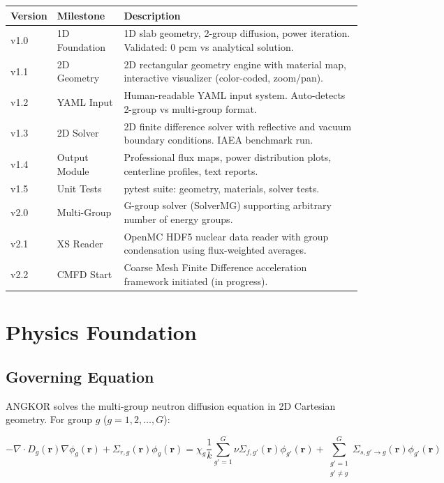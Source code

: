 \documentclass[12pt,a4paper]{article}
\begin{document}
\begin{longtable}{p{2.5cm} p{4cm} p{7cm}}
\toprule
\textbf{Version} & \textbf{Milestone} & \textbf{Description} \\
\midrule
v1.0 & 1D Foundation & 1D slab geometry, 2-group diffusion, power iteration.
Validated: 0 pcm vs analytical solution. \\[6pt]
v1.1 & 2D Geometry & 2D rectangular geometry engine with material map,
interactive visualizer (color-coded, zoom/pan). \\[6pt]
v1.2 & YAML Input & Human-readable YAML input system. Auto-detects 2-group
vs multi-group format. \\[6pt]
v1.3 & 2D Solver & 2D finite difference solver with reflective and vacuum
boundary conditions. IAEA benchmark run. \\[6pt]
v1.4 & Output Module & Professional flux maps, power distribution plots,
centerline profiles, text reports. \\[6pt]
v1.5 & Unit Tests & pytest suite: geometry, materials, solver tests. \\[6pt]
v2.0 & Multi-Group & G-group solver (SolverMG) supporting arbitrary
number of energy groups. \\[6pt]
v2.1 & XS Reader & OpenMC HDF5 nuclear data reader with group condensation
using flux-weighted averages. \\[6pt]
v2.2 & CMFD Start & Coarse Mesh Finite Difference acceleration framework
initiated (in progress). \\
\bottomrule
\end{longtable}

\section{Physics Foundation}

\subsection{Governing Equation}

ANGKOR solves the multi-group neutron diffusion equation in 2D Cartesian
geometry. For group $g$ ($g = 1, 2, \ldots, G$):

\begin{equation}
    -\nabla \cdot D_g(\mathbf{r}) \nabla \phi_g(\mathbf{r})
    + \Sigma_{r,g}(\mathbf{r}) \phi_g(\mathbf{r})
    = \chi_g \frac{1}{k} \sum_{g'=1}^{G} \nu\Sigma_{f,g'}(\mathbf{r})
      \phi_{g'}(\mathbf{r})
    + \sum_{\substack{g'=1\\g'\neq g}}^{G}
      \Sigma_{s,g'\to g}(\mathbf{r}) \phi_{g'}(\mathbf{r})
\end{equation}
\end{document}
